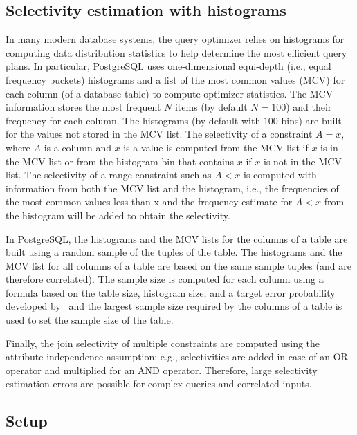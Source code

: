 \subsection{Selectivity estimation with histograms}\label{sec:vcfreqselhist}
In many modern database systems, the query optimizer relies on
histograms for computing data distribution statistics to help determine the most
efficient query plans. In particular, PostgreSQL 
uses one-dimensional equi-depth (i.e., equal frequency buckets) histograms and a
list of the most common values (MCV) for each column (of a database table) to
compute optimizer statistics. The MCV information stores the most
frequent $N$ items (by default $N=100$) and their frequency for each column. The
histograms (by default with $100$ bins) are built for the values not stored in
the MCV list. The selectivity of a constraint $A=x$, where $A$ is a
column and $x$ is a value is computed from the MCV list if $x$ is in the MCV
list or from the histogram bin that contains $x$ if $x$ is not in the MCV list.
The selectivity of a range constraint such as $A<x$ is computed with information from both the MCV
list and the histogram, i.e., the
frequencies of the most common values less than x and the frequency estimate for
$A<x$ from the histogram will be added to obtain the selectivity.

In PostgreSQL, the histograms and the MCV lists for the
columns of a table are built using a random sample of the tuples of the table. The
histograms and the MCV list for all columns of a table are based on the same
sample tuples (and are therefore correlated).  The sample size is computed for
each column using a formula based on the table size, histogram size, and a
target error probability developed by~\citet{ChaudhuriMN98}  and the largest sample size required by
the columns of a table is used to set the sample size of the table. 

Finally, the join selectivity of multiple constraints are computed using
the attribute independence assumption: e.g., selectivities are added in case of an
OR operator and multiplied for an AND operator.  Therefore, large selectivity
estimation errors are possible for complex queries and correlated inputs. 

\subsection{Setup}

